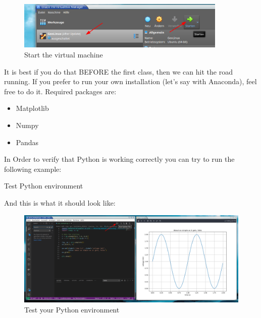 \begin{figure}[h!]
    \centering
    \includegraphics[width=10cm]{Figures/virtual_box2.png}
    \caption{Start the virtual machine}
\end{figure}

\vspace{1cm}

It is best if you do that BEFORE the first class, then we can hit the road running. If you prefer to run your own installation (let's say with Anaconda),
feel free to do it. Required packages are:

\begin{itemize}
    \item Matplotlib
    \item Numpy
    \item Pandas
\end{itemize}

In Order to verify that Python is working correctly you can try to run the following example:

\vspace{1cm}

\begin{tcolorbox}[enhanced jigsaw,breakable,pad at break*=1mm,
    colback=blue!5!white,colframe=babyblueeyes,title=Solutions,
    watermark color=white]
    Test Python environment
    
\end{tcolorbox}

\newpage

And this is what it should look like:

\vspace{1cm}

\begin{figure}[h!]
    \centering
    \includegraphics[width=18cm]{Figures/vs_code1.png}
    \caption{Test your Python environment}
\end{figure}

%    
